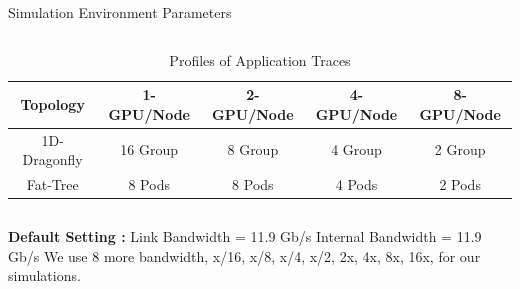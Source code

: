\documentclass[final]{beamer}
\begin{document}
\begin{frame}[t]
\begin{columns}[t]
\begin{column}{0.5\textwidth}
\begin{block}{Simulation Environment Parameters}
\begin{column}{0.3\textwidth}
\begin{table}
        \begin{tabular}{|c|c|c|c|c} \hline
        \hline
        \textbf{Topology} & \textbf{1-GPU/Node} & \textbf{2-GPU/Node} & \textbf{4-GPU/Node} & \textbf{8-GPU/Node}  \\ \hline
        \cellcolor{Blue!10}1D-Dragonfly & \cellcolor{Blue!10}16 Group & 
        \cellcolor{Blue!10}8 Group & 
        \cellcolor{Blue!10}4 Group & 
        \cellcolor{Blue!10}2 Group  \\    \hline
        
        \cellcolor{Blue!10}Fat-Tree & \cellcolor{Blue!10}8 Pods & 
        \cellcolor{Blue!10}8 Pods & 
        \cellcolor{Blue!10}4 Pods & 
        \cellcolor{Blue!10}2 Pods  \\    \hline
       
        \end{tabular}


\caption{Profiles of Application Traces}
\end{table}



  
  \end{column}
  \begin{column}{0.3\textwidth}
  \newline
  \newline
  \newline
  \newline
  \textbf{Default Setting : }
  \newline
  Link Bandwidth = 11.9 Gb/s
  \newline
  Internal Bandwidth = 11.9 Gb/s
  \newline
  \newline
  We use 8 more bandwidth, x/16, x/8, x/4, x/2, 2x, 4x, 8x, 16x, for our simulations.
  \end{column}
  \begin{column}{0.3\textwidth}
  

\end{column}
\end{block}
\end{column}
\end{columns}
\end{frame}
\end{document}
